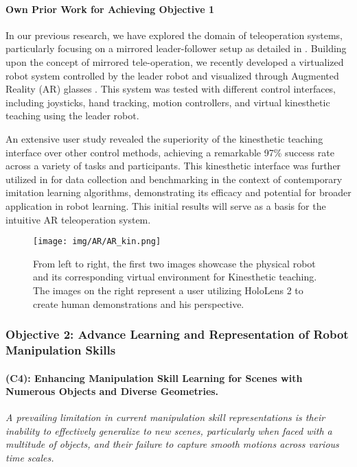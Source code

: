 \documentclass{erc-B2}
\begin{document}
\paragraph{Own Prior Work for Achieving  Objective 1}
In our previous research, we have explored the domain of teleoperation systems, particularly focusing on a mirrored leader-follower setup as detailed in \cite{Sing_teleop}. Building upon the concept of mirrored tele-operation, we recently developed a virtualized robot system controlled by the leader robot and visualized through Augmented Reality (AR) glasses \cite{jiang2023user}. This system was tested with different control interfaces, including joysticks, hand tracking, motion controllers, and virtual kinesthetic teaching using the leader robot.

An extensive user study revealed the superiority of the kinesthetic teaching interface over other control methods, achieving a remarkable 97\% success rate across a variety of tasks and participants. This kinesthetic interface was further utilized in \cite{David2024} for data collection and benchmarking in the context of contemporary imitation learning algorithms, demonstrating its efficacy and potential for broader application in robot learning. This initial results will serve as a basis for the intuitive AR teleoperation system. 


\begin{figure*}
    \centering
    \texttt{[image: img/AR/AR\_kin.png]}
    \caption{
    From left to right, the first two images showcase the physical robot and its corresponding virtual environment for Kinesthetic teaching. The images on the right represent a user utilizing HoloLens 2 to create human demonstrations and his perspective.
    }
    \label{fig:interfaces}
\end{figure*}


\subsubsection{Objective 2: Advance Learning and Representation of Robot Manipulation Skills}

\paragraph{(C4): Enhancing Manipulation Skill Learning for Scenes with Numerous Objects and Diverse Geometries.} \textit{
A prevailing limitation in current manipulation skill representations is their inability to effectively generalize to new scenes, particularly when faced with a multitude of objects, and their failure to capture smooth motions across various time scales.}
\end{document}
